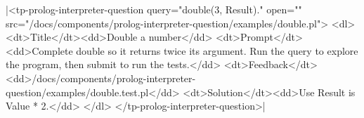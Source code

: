 \documentclass{article}
\begin{document}
\rawhtml|<tp-prolog-interpreter-question query="double(3, Result)." open="" src="/docs/components/prolog-interpreter-question/examples/double.pl">
  <dl>
    <dt>Title</dt><dd>Double a number</dd>
    <dt>Prompt</dt><dd>Complete double so it returns twice its argument. Run the query to explore the program, then submit to run the tests.</dd>
    <dt>Feedback</dt><dd>/docs/components/prolog-interpreter-question/examples/double.test.pl</dd>
    <dt>Solution</dt><dd>Use Result is Value * 2.</dd>
  </dl>
</tp-prolog-interpreter-question>|
\end{document}

